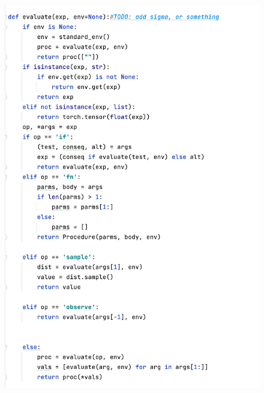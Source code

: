\documentclass{article}
\begin{document}
\begin{enumerate}
\begin{figure}[!ht]
	\centering
	\includegraphics[scale=0.5]{../figs/evaluate_2}
\end{figure}


\end{enumerate}
\end{document}
